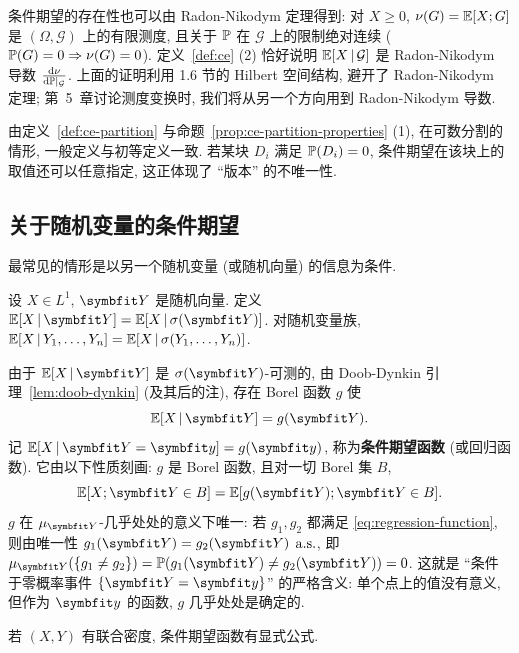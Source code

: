 \begin{remark}
条件期望的存在性也可以由 Radon-Nikodym 定理得到: 对 $X\ge0$, $\nu(G)=\E[X;G]$ 是 $(\Omega,\mathcal{G})$ 上的有限测度, 且关于 $\P$ 在 $\mathcal{G}$ 上的限制绝对连续 ($\P(G)=0\Rightarrow\nu(G)=0$). 定义~\ref{def:ce} (2) 恰好说明 $\E[X\,|\,\mathcal{G}]$ 是 Radon-Nikodym 导数 $\frac{\dd\nu}{\dd\P|_{\mathcal{G}}}$. 上面的证明利用 1.6 节的 Hilbert 空间结构, 避开了 Radon-Nikodym 定理; 第~5~章讨论测度变换时, 我们将从另一个方向用到 Radon-Nikodym 导数.
\end{remark}

由定义~\ref{def:ce-partition} 与命题~\ref{prop:ce-partition-properties} (1), 在可数分割的情形, 一般定义与初等定义一致. 若某块 $D_i$ 满足 $\P(D_i)=0$, 条件期望在该块上的取值还可以任意指定, 这正体现了 ``版本'' 的不唯一性.

\subsection{关于随机变量的条件期望}

最常见的情形是以另一个随机变量 (或随机向量) 的信息为条件.

\begin{definition}\label{def:ce-rv}
设 $X\in L^1$, $\rvec{Y}$ 是随机向量. 定义 $\E[X\,|\,\rvec{Y}]=\E[X\,|\,\sigma(\rvec{Y})]$. 对随机变量族, $\E[X\,|\,Y_1,\dots,Y_n]=\E[X\,|\,\sigma(Y_1,\dots,Y_n)]$.
\end{definition}

由于 $\E[X\,|\,\rvec{Y}]$ 是 $\sigma(\rvec{Y})$-可测的, 由 Doob-Dynkin 引理~\ref{lem:doob-dynkin} (及其后的注), 存在 Borel 函数 $g$ 使
\[
\E[X\,|\,\rvec{Y}]=g(\rvec{Y}).
\]
记 $\E[X\,|\,\rvec{Y}=\rvec{y}]=g(\rvec{y})$, 称为\textbf{条件期望函数} (或回归函数). 它由以下性质刻画: $g$ 是 Borel 函数, 且对一切 Borel 集 $B$,
\begin{equation}\label{eq:regression-function}
\E[X;\rvec{Y}\in B]=\E[g(\rvec{Y});\rvec{Y}\in B].
\end{equation}
$g$ 在 $\mu_{\rvec{Y}}$-几乎处处的意义下唯一: 若 $g_1,g_2$ 都满足 \eqref{eq:regression-function}, 则由唯一性 $g_1(\rvec{Y})=g_2(\rvec{Y})$ $\as$, 即 $\mu_{\rvec{Y}}(\{g_1\ne g_2\})=\P(g_1(\rvec{Y})\ne g_2(\rvec{Y}))=0$. 这就是 ``条件于零概率事件 $\{\rvec{Y}=\rvec{y}\}$'' 的严格含义: 单个点上的值没有意义, 但作为 $\rvec{y}$ 的函数, $g$ 几乎处处是确定的.

若 $(X,Y)$ 有联合密度, 条件期望函数有显式公式.

